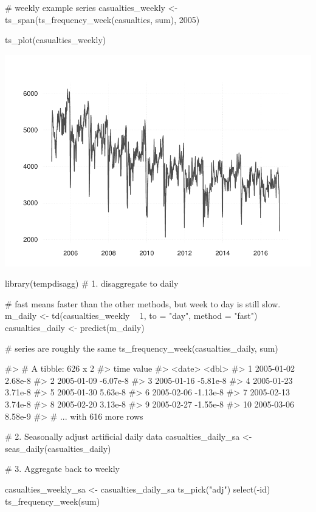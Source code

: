 \begin{Schunk}
\begin{Sinput}
# weekly example series
casualties_weekly <- ts_span(ts_frequency_week(casualties, sum), 2005)


ts_plot(casualties_weekly)
\end{Sinput}

\includegraphics[width=1\linewidth]{overview_files/figure-latex/weekly-1} \begin{Sinput}
library(tempdisagg)
# 1. disaggregate to daily

# fast means faster than the other methods, but week to day is still slow.
m_daily <- td(casualties_weekly ~ 1, to = "day", method = "fast")
casualties_daily <- predict(m_daily)

# series are roughly the same
ts_frequency_week(casualties_daily, sum) %
\end{Sinput}
\begin{Soutput}
#> # A tibble: 626 x 2
#>    time          value
#>    <date>        <dbl>
#>  1 2005-01-02  2.68e-8
#>  2 2005-01-09 -6.07e-8
#>  3 2005-01-16 -5.81e-8
#>  4 2005-01-23  3.71e-8
#>  5 2005-01-30  5.63e-8
#>  6 2005-02-06 -1.13e-8
#>  7 2005-02-13  3.74e-8
#>  8 2005-02-20  3.13e-8
#>  9 2005-02-27 -1.55e-8
#> 10 2005-03-06  8.58e-9
#> # ... with 616 more rows
\end{Soutput}
\begin{Sinput}
# 2. Seasonally adjust artificial daily data
casualties_daily_sa <- seas_daily(casualties_daily)


# 3. Aggregate back to weekly

casualties_weekly_sa <-
  casualties_daily_sa %
  ts_pick("adj") %
  select(-id) %
  ts_frequency_week(sum)



\end{Sinput}
\end{Schunk}
